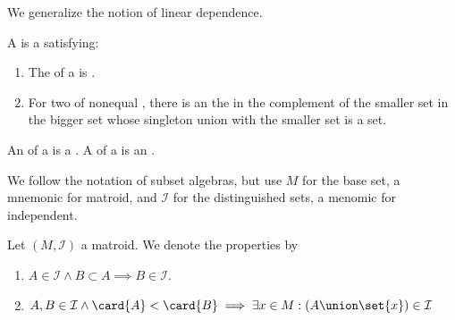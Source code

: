 

We generalize the notion of linear dependence.


A  is a
satisfying:
\begin{enumerate}

  \item The  of a
     is
    .

  \item For two 
     of nonequal ,
    there is an  the 
    in the complement of the smaller set in the bigger set whose
    singleton union with the smaller set is a  set.
\end{enumerate}

An 
of a  is a
.
A 
of a  is an
.



We follow the notation of subset algebras, but use $M$ for the base
set, a mnemonic for matroid, and $\mathcal{I}$ for the distinguished
sets, a menomic for independent.

Let $(M, \mathcal{I})$ a matroid.
We denote the properties by
\begin{enumerate}
  \item $A \in \mathcal{I} \land B \subset A \implies B \in \mathcal{I}$.
  \item $A, B \in \mathcal{I} \land \card{A} < \card{B} \implies \exists x \in M: (A \union \set{x}) \in \mathcal{I}$
\end{enumerate}

\blankpage
